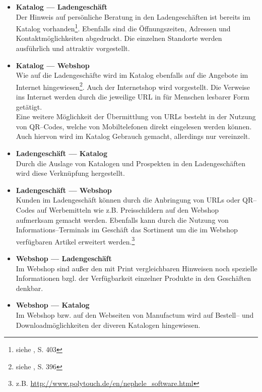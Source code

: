 \begin{itemize}
\item{\textbf{Katalog --- Ladengeschäft}\\
Der Hinweis auf persönliche Beratung in den Ladengeschäften ist bereits im Katalog vorhanden\footnote{siehe \cite{manufactum}, S. 403}. Ebenfalls sind die Öffnungszeiten, Adressen und Kontaktmöglichkeiten abgedruckt. Die einzelnen Standorte werden ausführlich und attraktiv vorgestellt.
}
\item{\textbf{Katalog --- Webshop}\\
Wie auf die Ladengeschäfte wird im Katalog ebenfalls auf die Angebote im Internet hingewiesen\footnote{siehe \cite{manufactum}, S. 396}. Auch der Internetshop wird vorgestellt. Die Verweise ins Internet werden durch die jeweilige \ac{URL} in für Menschen lesbarer Form getätigt.\\
Eine weitere Möglichkeit der Übermittlung von URLs besteht in der Nutzung von QR--Codes, welche von Mobiltelefonen direkt eingelesen werden können. Auch hiervon wird im Katalog Gebrauch gemacht, allerdings nur vereinzelt.
}
\item{\textbf{Ladengeschäft --- Katalog}\\
Durch die Auslage von Katalogen und Prospekten in den Ladengeschäften wird diese Verknüpfung hergestellt.
}
\item{\textbf{Ladengeschäft --- Webshop}\\
Kunden im Ladengeschäft können durch die Anbringung von \ac{URL}s oder QR--Codes auf Werbemitteln wie z.B. Preisschildern auf den Webshop aufmerksam gemacht werden. Ebenfalls kann durch die Nutzung von Infor\-mations–Ter\-minals im Geschäft das Sortiment um die im Webshop verfügbaren Artikel erweitert werden.\footnote{z.B. \url{http://www.polytouch.de/en/nephele_software.html}}
}
\item{\textbf{Webshop --- Ladengeschäft}\\
Im Webshop sind außer den mit Print vergleichbaren Hinweisen noch spezielle Informationen bzgl. der Verfügbarkeit einzelner Produkte in den Geschäften denkbar. 
}
\item{\textbf{Webshop --- Katalog}\\
Im Webshop bzw. auf den Webseiten von Manufactum wird auf Bestell-- und Downloadmöglichkeiten der diveren Katalogen hingewiesen.
}
\end{itemize}